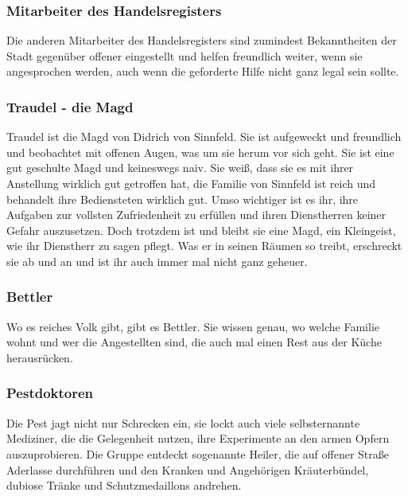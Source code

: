 \subsubsection*{Mitarbeiter des Handelsregisters}
\label{Mitarbeiter}

Die anderen Mitarbeiter des Handelsregisters sind zumindest Bekanntheiten der Stadt gegenüber offener eingestellt und helfen freundlich weiter, wenn sie angesprochen werden, auch wenn die geforderte Hilfe nicht ganz legal sein sollte.

\subsubsection*{Traudel - die Magd}
\label{Traudel}

Traudel ist die Magd von Didrich von Sinnfeld. Sie ist aufgeweckt und freundlich und beobachtet mit offenen Augen, was um sie herum vor sich geht. Sie ist eine gut geschulte Magd und keineswegs naiv. Sie weiß, dass sie es mit ihrer Anstellung wirklich gut getroffen hat, die Familie von Sinnfeld ist reich und behandelt ihre Bediensteten wirklich gut. Umso wichtiger ist es ihr, ihre Aufgaben zur vollsten Zufriedenheit zu erfüllen und ihren Dienstherren keiner Gefahr auszusetzen. Doch trotzdem ist und bleibt sie eine Magd, ein Kleingeist, wie ihr Dienstherr zu sagen pflegt. Was er in seinen Räumen so treibt, erschreckt sie ab und an und ist ihr auch immer mal nicht ganz geheuer.

\subsubsection*{Bettler}
\label{Bettler}

Wo es reiches Volk gibt, gibt es Bettler. Sie wissen genau, wo welche Familie wohnt und wer die Angestellten sind, die auch mal einen Rest aus der Küche herausrücken.

\subsubsection*{Pestdoktoren}
\label{Pestdoktoren}

Die Pest jagt nicht nur Schrecken ein, sie lockt auch viele selbsternannte Mediziner, die die Gelegenheit nutzen, ihre Experimente an den armen Opfern auszuprobieren. Die Gruppe entdeckt sogenannte Heiler, die auf offener Straße Aderlasse durchführen und den Kranken und Angehörigen Kräuterbündel, dubiose Tränke und Schutzmedaillons andrehen.

